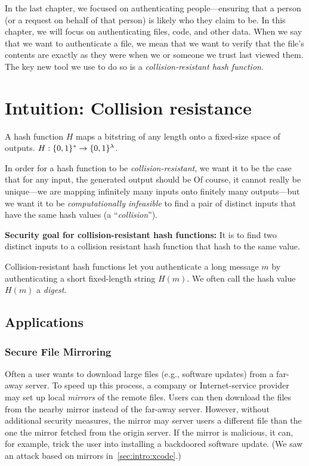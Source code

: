 In the last chapter, we focused on authenticating people---ensuring that
a person (or a request on behalf of that person) is likely who they claim to be.
In this chapter, we will focus on authenticating
files, code, and other data.
When we say that we want to authenticate a file,
we mean that we want to verify that the file's
contents are exactly as they were when we or
someone we trust last viewed them.
The key new tool we use to do so is a \textit{collision-resistant hash function}. 

\section{Intuition: Collision resistance}
\begin{definition}
	A hash function $H$ maps a bitstring of any length onto a fixed-size space of outputs. $H: \{0,1\}^* \rightarrow \{0,1\}^{\lambda}$.
\end{definition}

In order for a hash function to be \textit{collision-resistant}, we want it to be the case that for any input, the generated output should be  Of course, it cannot really be unique---we are mapping infinitely many inputs onto finitely many outputs---but we want it to be \textit{computationally infeasible} to find a 
pair of distinct inputs that have the same hash values (a ``\textit{collision}'').

\begin{framed}
  \textbf{Security goal for collision-resistant hash functions:}
  It is  to find two distinct inputs 
  to a collision resistant hash function that hash to the same value.
\end{framed}

Collision-resistant hash functions let you authenticate 
a long message $m$ by authenticating a short fixed-length string $H(m)$.
We often call the hash value $H(m)$ a \emph{digest}.

\subsection{Applications}
\subsubsection{Secure File Mirroring}
Often a user wants to download large files (e.g., software updates) from a far-away server.
To speed up this process, a company or Internet-service provider may set up local \emph{mirrors}
of the remote files.
Users can then download the files from the nearby mirror instead of the far-away server.
However, without additional security measures, the mirror may 
server users a different file than the one the mirror fetched from the origin server.
If the mirror is malicious, it can, for example, trick the user into installing
a backdoored software update.
(We saw an attack based on mirrors in~\cref{sec:intro:xcode}.)

